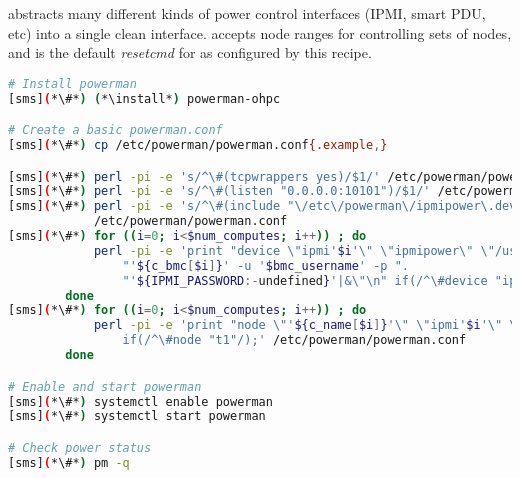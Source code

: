 \powerman{} abstracts many different kinds of power control interfaces (IPMI, 
smart PDU, etc) into a single clean interface. \powerman{} accepts node ranges
for controlling sets of nodes, and is the default {\em resetcmd} for \conman{}
as configured by this recipe.

\begin{lstlisting}[language=bash,keywords={},upquote=true]
# Install powerman
[sms](*\#*) (*\install*) powerman-ohpc

# Create a basic powerman.conf
[sms](*\#*) cp /etc/powerman/powerman.conf{.example,}

[sms](*\#*) perl -pi -e 's/^\#(tcpwrappers yes)/$1/' /etc/powerman/powerman.conf
[sms](*\#*) perl -pi -e 's/^\#(listen "0.0.0.0:10101")/$1/' /etc/powerman/powerman.conf
[sms](*\#*) perl -pi -e 's/^\#(include "\/etc\/powerman\/ipmipower\.dev")/$1/' \
            /etc/powerman/powerman.conf
[sms](*\#*) for ((i=0; i<$num_computes; i++)) ; do
            perl -pi -e 'print "device \"ipmi'$i'\" \"ipmipower\" \"/usr/sbin/ipmipower -h ".
                "'${c_bmc[$i]}' -u '$bmc_username' -p ".
                "'${IPMI_PASSWORD:-undefined}'|&\"\n" if(/^\#device "ipmi1"/);' /etc/powerman/powerman.conf
        done
[sms](*\#*) for ((i=0; i<$num_computes; i++)) ; do
            perl -pi -e 'print "node \"'${c_name[$i]}'\" \"ipmi'$i'\" \"'${c_bmc[$i]}'\"\n"
                if(/^\#node "t1"/);' /etc/powerman/powerman.conf
        done

# Enable and start powerman
[sms](*\#*) systemctl enable powerman
[sms](*\#*) systemctl start powerman

# Check power status
[sms](*\#*) pm -q
\end{lstlisting}

